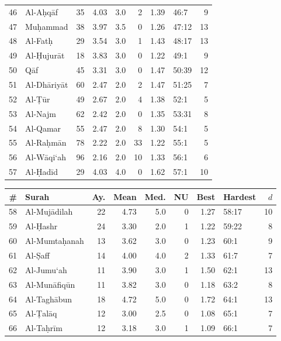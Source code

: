 \documentclass[11pt,a4paper]{article}
\begin{document}
\begin{table}[h]
\begin{minipage}[t]{0.48\textwidth}
\begin{tabular}{rl r r r r r lr}
46 & Al-A\d{h}q\=af & 35 & 4.03 & 3.0 & 2 & 1.39 & 46:7 & 9 \\
47 & Mu\d{h}ammad & 38 & 3.97 & 3.5 & 0 & 1.26 & 47:12 & 13 \\
48 & Al-Fat\d{h} & 29 & 3.54 & 3.0 & 1 & 1.43 & 48:17 & 13 \\
49 & Al-\d{H}ujur\=at & 18 & 3.83 & 3.0 & 0 & 1.22 & 49:1 & 9 \\
50 & Q\=af & 45 & 3.31 & 3.0 & 0 & 1.47 & 50:39 & 12 \\
51 & Al-Dh\=ariy\=at & 60 & 2.47 & 2.0 & 2 & 1.47 & 51:25 & 7 \\
52 & Al-\d{T}\=ur & 49 & 2.67 & 2.0 & 4 & 1.38 & 52:1 & 5 \\
53 & Al-Najm & 62 & 2.42 & 2.0 & 0 & 1.35 & 53:31 & 8 \\
54 & Al-Qamar & 55 & 2.47 & 2.0 & 8 & 1.30 & 54:1 & 5 \\
55 & Al-Ra\d{h}m\=an & 78 & 2.22 & 2.0 & 33 & 1.22 & 55:1 & 5 \\
56 & Al-W\=aqi`ah & 96 & 2.16 & 2.0 & 10 & 1.33 & 56:1 & 6 \\
57 & Al-\d{H}ad\=id & 29 & 4.03 & 4.0 & 0 & 1.62 & 57:1 & 10 \\
\bottomrule
\end{tabular}
\end{minipage}%
\hfill
\begin{minipage}[t]{0.48\textwidth}
\centering
\begin{tabular}{rl r r r r r lr}
\toprule
\textbf{\#} & \textbf{Surah} & \textbf{Ay.} & \textbf{Mean} & \textbf{Med.} & \textbf{NU} & \textbf{Best} & \textbf{Hardest} & \textbf{$d$} \\
\midrule
58 & Al-Muj\=adilah & 22 & 4.73 & 5.0 & 0 & 1.27 & 58:17 & 10 \\
59 & Al-\d{H}ashr & 24 & 3.30 & 2.0 & 1 & 1.22 & 59:22 & 8 \\
60 & Al-Mumta\d{h}anah & 13 & 3.62 & 3.0 & 0 & 1.23 & 60:1 & 9 \\
61 & Al-\d{S}aff & 14 & 4.00 & 4.0 & 2 & 1.33 & 61:7 & 7 \\
62 & Al-Jumu`ah & 11 & 3.90 & 3.0 & 1 & 1.50 & 62:1 & 13 \\
63 & Al-Mun\=afiq\=un & 11 & 3.82 & 3.0 & 0 & 1.18 & 63:2 & 8 \\
64 & Al-Tagh\=abun & 18 & 4.72 & 5.0 & 0 & 1.72 & 64:1 & 13 \\
65 & Al-\d{T}al\=aq & 12 & 3.00 & 2.5 & 0 & 1.08 & 65:1 & 7 \\
66 & Al-Ta\d{h}r\=im & 12 & 3.18 & 3.0 & 1 & 1.09 & 66:1 & 7 \\

\end{tabular}
\end{minipage}
\end{table}
\end{document}

